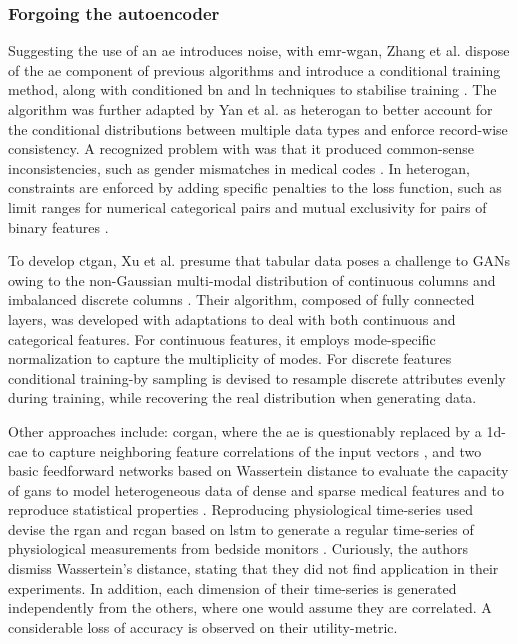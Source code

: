 \subsubsection{Forgoing the autoencoder}\label{noauto}

Suggesting the use of an \gls{ae} introduces noise, with \gls{emr-wgan}, Zhang et al. dispose of the \gls{ae} component of previous algorithms and introduce a conditional training method, along with conditioned \gls{bn} and \gls{ln} techniques to stabilise training \cite{Zhang2020-wp}. The algorithm was further adapted by Yan et al. as \gls{heterogan} to better account for the conditional distributions between multiple data types and enforce record-wise consistency. A recognized problem with  was that it produced common-sense inconsistencies, such as gender mismatches in medical codes \cite{yan2020generating, choi2017generating}. In \gls{heterogan}, constraints are enforced by adding specific penalties to the loss function, such as limit ranges for numerical categorical pairs and mutual exclusivity for pairs of binary features \cite{yan2020generating}. \par

To develop \gls{ctgan}, Xu et al. presume that tabular data poses a challenge to GANs owing to the non-Gaussian multi-modal distribution of continuous columns and imbalanced discrete columns \cite{Xu2019-ay}. Their algorithm, composed of fully connected layers, was developed with adaptations to deal with both continuous and categorical features. For continuous features, it employs mode-specific normalization to capture the multiplicity of modes. For discrete features conditional training-by sampling is devised to resample discrete attributes evenly during training, while recovering the real distribution when generating data.\par

Other approaches include: \gls{corgan}, where the \gls{ae} is questionably replaced by a \gls{1d-cae} to capture neighboring feature correlations of the input vectors \cite{torfi2019generating}, and two basic feedforward networks based on Wassertein distance to evaluate the capacity of \glspl{gan} to model heterogeneous data of dense and sparse medical features \cite{chincheong2020generation} and to reproduce statistical properties \cite{ozyigit2020generation}. Reproducing physiological time-series \citeauthor{esteban2017real} used devise the \gls{rgan} and \gls{rcgan} based on \gls{lstm} to generate a regular time-series of physiological measurements from bedside monitors \cite{esteban2017real}. Curiously, the authors dismiss Wassertein's distance, stating that they did not find application in their experiments. In addition, each dimension of their time-series is generated independently from the others, where one would assume they are correlated. A considerable loss of accuracy is observed on their \gls{utility-metric}.

